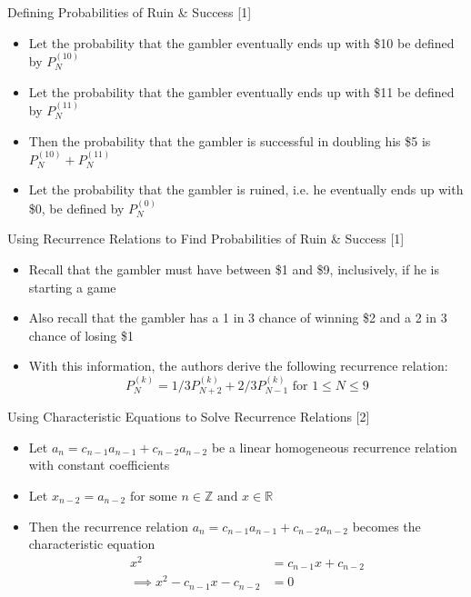 \documentclass[14pt]{beamer}
\begin{document}
\begin{frame}{Defining Probabilities of Ruin \& Success [1]}
 \begin{itemize}
     \item Let the probability that the gambler eventually ends up with \$10 be defined by $P^{(10)}_N$
     \item Let the probability that the gambler eventually ends up with \$11 be defined by $P^{(11)}_N$
     \item Then the probability that the gambler is successful in doubling his \$5 is $P^{(10)}_N + P^{(11)}_N$
     \item Let the probability that the gambler is ruined, i.e. he eventually ends up with \$0, be defined by $P^{(0)}_N$
 \end{itemize}  
\end{frame}

\begin{frame}{Using Recurrence Relations to Find Probabilities of Ruin \& Success [1]}
 \begin{itemize}
     \item Recall that the gambler must have between \$1 and \$9, inclusively, if he is starting a game
     \item Also recall that the gambler has a 1 in 3 chance of winning \$2 and a 2 in 3 chance of losing \$1
     \item With this information, the authors derive the following recurrence relation:
     $$P^{(k)}_N = 1/3P^{(k)}_{N+2} + 2/3P^{(k)}_{N-1} \text{ for } 1 \leq N \leq 9$$
 \end{itemize}
\end{frame}

\begin{frame}{Using Characteristic Equations to Solve Recurrence Relations [2]}
 \begin{itemize}
     \item Let $a_n = c_{n-1}a_{n-1} + c_{n-2}a_{n-2}$ be a linear homogeneous recurrence relation with constant coefficients
     \item Let $x_{n-2} = a_{n-2} \text { for some } n \in \mathbb{Z} \text{ and } x \in \mathbb{R}$
     \item Then the recurrence relation $a_n = c_{n-1}a_{n-1} + c_{n-2}a_{n-2}$ becomes the characteristic equation
        \begin{align}
            x^2 &= c_{n-1}x + c_{n-2} \\
            \implies x^2 - c_{n-1}x - c_{n-2} &= 0
        \end{align}
 \end{itemize} 
\end{frame}
\end{document}
